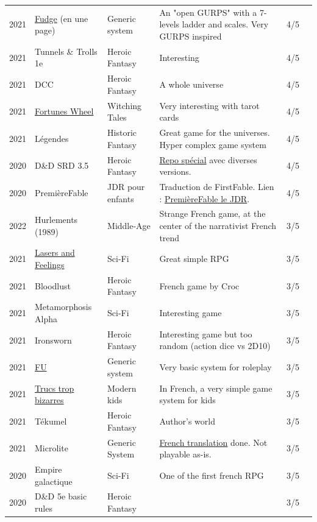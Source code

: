 \documentclass[a4paper, 11pt, twoside]{article}
\begin{document}
\begin{longtable}{cp{2cm}p{1.5cm}p{7cm}cc}
2021 & \href{https://github.com/orey/jdr/blob/master/Fudge-fr/FudgeEnUnePage-ORey03.pdf}{Fudge} (en une page) & Generic system & An "open GURPS" with a 7-levels ladder and scales. Very GURPS inspired & 4/5\\
2021 & Tunnels \& Trolls 1e & Heroic Fantasy & Interesting & 4/5\\
2021 & DCC & Heroic Fantasy & A whole universe & 4/5\\
2021 & \href{http://www.fortuneswheel.co.uk/}{Fortunes Wheel} & Witching Tales & Very interesting with tarot cards & 4/5\\
2021 & Légendes & Historic Fantasy & Great game for the universes. Hyper complex game system & 4/5\\
2020 & D\&D SRD 3.5 & Heroic Fantasy & \href{https://github.com/orey/srd-3.5}{Repo spécial} avec diverses versions. & 4/5\\
2020 & PremièreFable & JDR pour enfants & Traduction de FirstFable. Lien : \href{https://orey.github.io/premierefable/}{PremièreFable le JDR}. & 4/5\\
2022 & Hurlements (1989) & Middle-Age & Strange French game, at the center of the narrativist French trend & 3/5\\
2021 & \href{http://www.onesevendesign.com/laserfeelings/}{Lasers and Feelings} & Sci-Fi & Great simple RPG & 3/5\\
2021 & Bloodlust & Heroic Fantasy & French game by Croc & 3/5\\
2021 & Metamorphosis Alpha & Sci-Fi & Interesting game & 3/5\\
2021 & Ironsworn & Heroic Fantasy & Interesting game but too random (action dice vs 2D10) & 3/5\\
2021 & \href{https://www.drivethrurpg.com/product/89534/FU-The-Freeform-Universal-RPG-Classic-rules}{FU} & Generic system & Very basic system for roleplay & 3/5\\
2021 & \href{http://storygame.free.fr/}{Trucs trop bizarres} & Modern kids & In French, a very simple game system for kids & 3/5\\
2021 & Tékumel & Heroic Fantasy & Author's world & 3/5\\
2021 & Microlite & Generic System & \href{https://github.com/orey/jdr/tree/master/Microlite20-fr}{French translation} done. Not playable as-is. & 3/5\\
2020 & Empire galactique & Sci-Fi & One of the first french RPG & 3/5\\
2020 & D\&D 5e basic rules & Heroic Fantasy &  & 3/5\\

\end{longtable}
\end{document}
